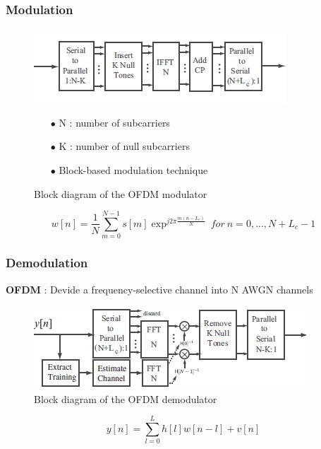\documentclass[11pt]{beamer}
\begin{document}
\begin{frame}
\frametitle{Modulation}

\begin{figure}[!ht]
    \begin{minipage}[b]{0.48\linewidth}
        \centering \includegraphics[scale=0.6]{img/OFDDM_modulator.png}
     \caption{Block diagram of the OFDM modulator}
     \label{fig2}
    \end{minipage}\hfill
    \begin{minipage}[b]{0.48\linewidth}  
    \centering  
    \begin{itemize}
    \item[$\bullet$] N : number of subcarriers
    \item[$\bullet$] K : number of null subcarriers
    \item[$\bullet$] Block-based modulation technique
    \end{itemize}
        
    \end{minipage}
\end{figure}
\begin{equation}
w[n]=\frac{1}{N} \sum_{m=0}^{N-1} s[m]\exp^{j2\pi\frac{m(n-L_c)}{N}}~for~n=0,...,N+L_c-1
\end{equation}
\end{frame}

\begin{frame}
\frametitle{Demodulation}

\textbf{OFDM} : Devide a frequency-selective channel into N AWGN channels

\begin{figure}[!ht]
         \centering \includegraphics[scale=0.75]{img/OFDDM_demodulator.png}
 \caption{Block diagram of the OFDM demodulator}\label{fig3}  
\end{figure}
\begin{equation}  
 y[n]=\sum_{l=0}^{L} h[l]w[n-l]+v[n]
 \end{equation}
 

\end{frame}
\end{document}
